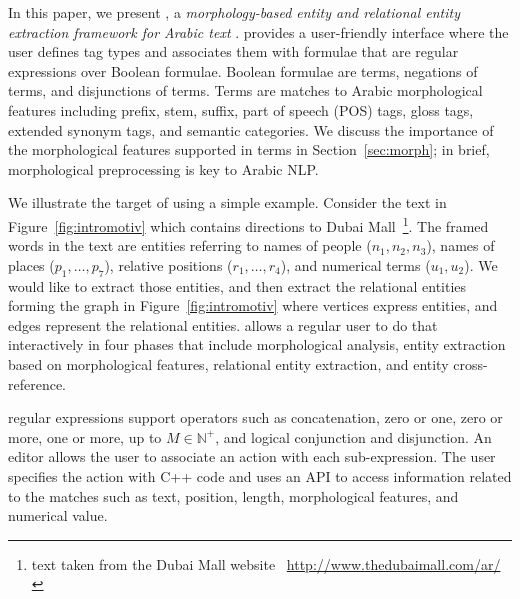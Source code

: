 


In this paper, 
we present \framework, a {\em morphology-based entity and relational entity
extraction framework for Arabic text }. 
\framework provides a user-friendly interface where the user defines tag types 
and associates them with \framework formulae that are regular expressions over 
\framework Boolean formulae. 
Boolean formulae are terms, negations of terms, and disjunctions of terms. 
Terms are matches to Arabic morphological features including 
prefix, stem, suffix, part of speech (POS) tags, gloss tags, extended synonym tags, 
and semantic categories. 
We discuss the importance of the morphological features supported in 
\framework terms in Section~\ref{sec:morph}; in brief, morphological preprocessing
is key to Arabic NLP.%

We illustrate the target of \framework using a simple example. 
Consider the text in Figure~\ref{fig:intromotiv} which contains
directions to Dubai Mall~\footnote{text taken from the Dubai Mall website
~\url{http://www.thedubaimall.com/ar/}}.
The framed words in the text are entities referring to names of people 
($n_1,n_2,n_3$), 
names of places ($p_1,\dots,p_7$), 
relative positions ($r_1,\dots,r_4$), 
and numerical terms ($u_1,u_2$). 
We would like to extract those entities, and then extract
the relational entities forming the graph in Figure~\ref{fig:intromotiv} 
where vertices express entities, 
and edges represent the relational entities.
\framework allows a regular user to do that interactively
in four phases that include morphological analysis, 
entity extraction based on morphological features, 
relational entity extraction, and entity cross-reference.

\framework regular expressions support operators such as concatenation, 
zero or one, zero or more, one or more, up to $M\in\mathbb{N}^+$, and logical 
conjunction and disjunction. 
An editor allows the user to associate an action with each sub-expression.
The user specifies the action with C++ code and uses an API to access information related to the matches such as text, position, length, morphological features, and numerical value.

